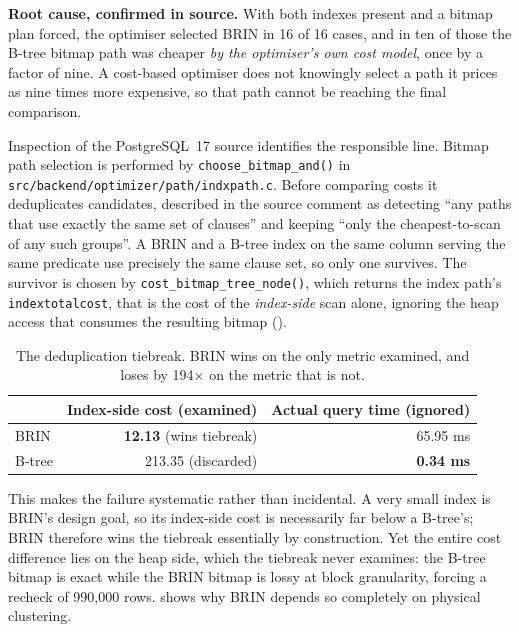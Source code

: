 \documentclass[12pt, a4paper]{article}
\begin{document}
\textbf{Root cause, confirmed in source.} With both indexes present and
a bitmap plan forced, the optimiser selected BRIN in 16 of 16 cases, and
in ten of those the B-tree bitmap path was cheaper \emph{by the
optimiser's own cost model}, once by a factor of nine. A cost-based
optimiser does not knowingly select a path it prices as nine times more
expensive, so that path cannot be reaching the final comparison.

Inspection of the PostgreSQL~17 source identifies the responsible line.
Bitmap path selection is performed by \texttt{choose\_bitmap\_and()} in
\texttt{src/backend/\allowbreak optimizer/\allowbreak path/\allowbreak indxpath.c}. Before comparing costs
it deduplicates candidates, described in the source comment as detecting
``any paths that use exactly the same set of clauses'' and keeping
``only the cheapest-to-scan of any such groups''. A BRIN and a B-tree
index on the same column serving the same predicate use precisely the
same clause set, so only one survives. The survivor is chosen by
\texttt{cost\_bitmap\_tree\_node()}, which returns the index path's
\texttt{indextotalcost}, that is the cost of the \emph{index-side} scan
alone, ignoring the heap access that consumes the resulting bitmap
().

\begin{table}[htbp]
\centering
\caption{The deduplication tiebreak. BRIN wins on the only metric
examined, and loses by 194$\times$ on the metric that is not.}
\label{tab:brincause}
\small
\begin{tabular}{@{}lrr@{}}
\toprule
& \textbf{Index-side cost (examined)} & \textbf{Actual query time (ignored)} \\
\midrule
BRIN & \textbf{12.13} (wins tiebreak) & 65.95 ms \\
B-tree & 213.35 (discarded) & \textbf{0.34 ms} \\
\bottomrule
\end{tabular}
\end{table}

This makes the failure systematic rather than incidental. A very small
index is BRIN's design goal, so its index-side cost is necessarily far
below a B-tree's; BRIN therefore wins the tiebreak essentially by
construction. Yet the entire cost difference lies on the heap side,
which the tiebreak never examines: the B-tree bitmap is exact while the
BRIN bitmap is lossy at block granularity, forcing a recheck of 990{,}000
rows.  shows why BRIN depends so completely on
physical clustering.
\end{document}
